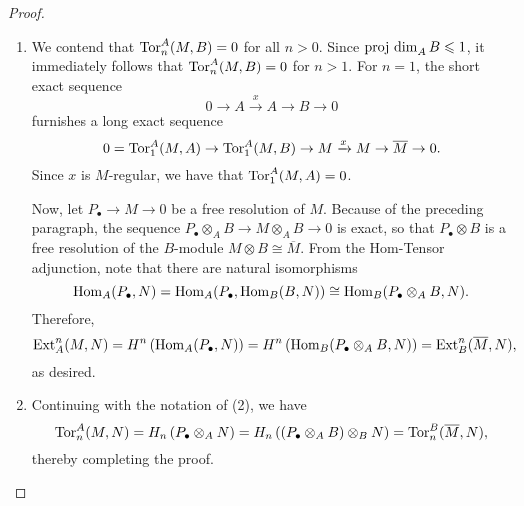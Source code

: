 \begin{proof}
\begin{enumerate}[label=(\arabic*)]
\item We contend that $\operatorname{Tor}^A_n(M, B) = 0$ for all $n > 0$. Since $\operatorname{proj~dim}_A B\leqslant 1$, it immediately follows that $\operatorname{Tor}^A_n(M, B) = 0$ for $n > 1$. For $n = 1$, the short exact sequence 
\begin{equation*}
    0\to A\xrightarrow x A\to B\to 0 
\end{equation*}
furnishes a long exact sequence 
\begin{equation*}
    0 = \operatorname{Tor}^A_1(M, A)\to\operatorname{Tor}^A_1(M, B)\to M\xrightarrow x M\to \overline M\to 0.
\end{equation*}
Since $x$ is $M$-regular, we have that $\operatorname{Tor}^A_1(M, A) = 0$.

Now, let $P_\bullet\to M\to 0$ be a free resolution of $M$. Because of the preceding paragraph, the sequence $P_\bullet\otimes_A B\to M\otimes_A B\to 0$ is exact, so that $P_\bullet\otimes B$ is a free resolution of the $B$-module $M\otimes B\cong\overline M$. From the Hom-Tensor adjunction, note that there are natural isomorphisms
\begin{equation*}
    \operatorname{Hom}_A(P_\bullet, N) = \operatorname{Hom}_A(P_\bullet, \operatorname{Hom}_B(B, N))\cong\operatorname{Hom}_B(P_\bullet\otimes_A B, N).
\end{equation*}
Therefore, 
\begin{equation*}
    \operatorname{Ext}^n_A(M, N) = H^n\left(\operatorname{Hom}_A(P_\bullet, N)\right) = H^n\left(\operatorname{Hom}_B(P_\bullet\otimes_A B, N)\right) = \operatorname{Ext}^n_B(\overline M, N),
\end{equation*}
as desired.

\item Continuing with the notation of (2), we have 
\begin{equation*}
    \operatorname{Tor}^A_n(M, N) = H_n\left(P_\bullet\otimes_A N\right) = H_n\left((P_\bullet\otimes_A B)\otimes_B N\right) = \operatorname{Tor}^B_n(\overline M, N),
\end{equation*}
thereby completing the proof. \qedhere
\end{enumerate}
\end{proof}
